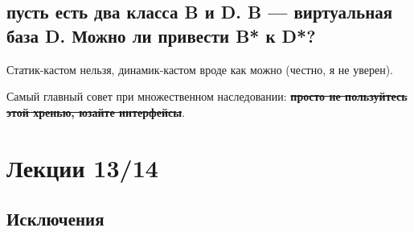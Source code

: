 \documentclass[15pt, a4paper]{article}
\newcommand{\nl}{\newline}
\begin{document}
\subsection{пусть есть два класса B и D. B — виртуальная база D. Можно ли привести B* к D*?}
Статик-кастом нельзя, динамик-кастом вроде как можно (честно, я не уверен). \nl

Самый главный совет при множественном наследовании: \textbf{\sout{просто не пользуйтесь этой хренью, юзайте интерфейсы}}. \newpage

\section{Лекции 13/14}
\subsection{Исключения}
\end{document}
